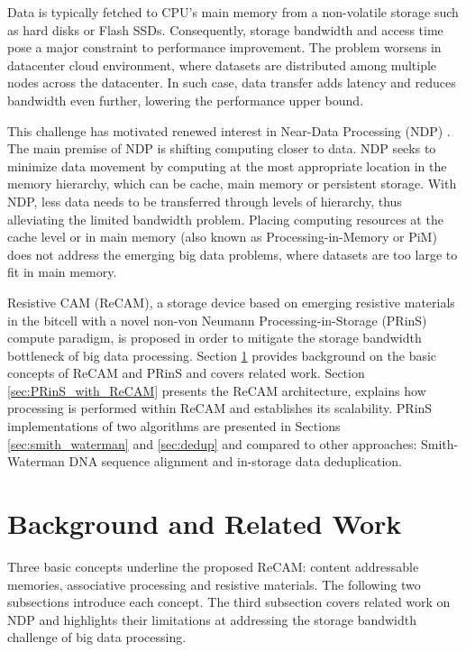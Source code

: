 \documentclass{superfri}
\begin{document}
	Data is typically fetched to CPU's main memory from a non-volatile storage such as hard disks or Flash SSDs. Consequently, storage bandwidth and access time pose a major constraint to performance improvement. The problem worsens in datacenter cloud environment, where datasets are distributed among multiple nodes across the datacenter. In such case, data transfer adds latency and reduces bandwidth even further, lowering the performance upper bound.
	
	This challenge has motivated renewed interest in Near-Data Processing (NDP) \cite{balasubramonian2014near}. The main premise of NDP is shifting computing closer to data. NDP seeks to minimize data movement by computing at the most appropriate location in the memory hierarchy, which can be cache, main memory or persistent storage. With NDP, less data needs to be transferred through levels of hierarchy, thus alleviating the limited bandwidth problem. Placing computing resources at the cache level or in main memory (also known as Processing-in-Memory or PiM) does not address the emerging big data problems, where datasets are too large to fit in main memory. 
	
	Resistive CAM (ReCAM), a storage device based on emerging resistive materials in the bitcell with a novel non-von Neumann Processing-in-Storage (PRinS) compute paradigm, is proposed in order to mitigate the storage bandwidth bottleneck of big data processing. Section \ref{sec:background} provides background on the basic concepts of ReCAM and PRinS and covers related work. Section \ref{sec:PRinS_with_ReCAM} presents the ReCAM architecture, explains how processing is performed within ReCAM and establishes its scalability. PRinS implementations of two algorithms are presented in Sections \ref{sec:smith_waterman} and \ref{sec:dedup} and compared to other approaches: Smith-Waterman DNA sequence alignment and in-storage data deduplication.
	
	
	\section{Background and Related Work}
	\label{sec:background}
	Three basic concepts underline the proposed ReCAM: content addressable memories, associative processing and resistive materials. The following two subsections introduce each concept. The third subsection covers related work on NDP and highlights their limitations at addressing the storage bandwidth challenge of big data processing.
	
\end{document}
